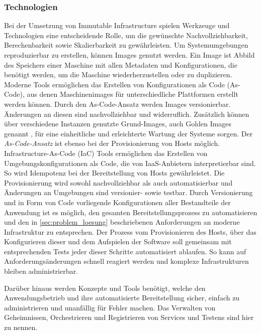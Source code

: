 \documentclass[11pt]{scrartcl}
\begin{document}
\subsubsection{Technologien} 
Bei der Umsetzung von Immutable Infrastructure spielen Werkzeuge und Technologien eine entscheidende Rolle, um die gewünschte Nachvollziehbarkeit, Berechenbarkeit sowie Skalierbarkeit zu gewährleisten. \newline 
Um Systemumgebungen reproduzierbar zu erstellen, können Images genutzt werden. Ein Image ist Abbild des Speichers einer Maschine mit allen Metadaten und Konfigurationen, die benötigt werden, um die Maschine wiederherzustellen oder zu duplizieren. Moderne Tools ermöglichen das Erstellen von Konfigurationen als Code (As-Code), aus denen Maschinenimages für unterschiedliche Plattformen erstellt werden können. Durch den \glqq As-Code\grqq{}-Ansatz werden Images versionierbar. Änderungen an diesen sind nachvollziehbar und widerruflich. Zusätzlich können über verschiedene Instanzen genutzte Grund-Images, auch Golden Images genannt \cite{GoldenImage:2018}, für eine einheitliche und erleichterte Wartung der Systeme sorgen. 
\newline
Der \textit{As-Code-Ansatz } ist ebenso bei der Provisionierung von Hosts möglich. Infrastructure-As-Code (IaC) Tools ermöglichen das Erstellen von Umgebungskonfigurationen als Code, die von IaaS-Anbietern interpretierbar sind. So wird Idempotenz bei der Bereitstellung von Hosts gewährleistet. Die Provisionierung wird sowohl nachvollziehbar als auch automatisierbar und Änderungen an Umgebungen sind versionier- sowie testbar.
Durch Versionierung und in Form von Code vorliegende Konfigurationen aller Bestandteile der Anwendung ist es möglich, den gesamten Bereitstellungsprozess zu automatisieren und den in \cref{sec:problem_loesung} beschriebenen Anforderungen an moderne Infrastruktur zu entsprechen. Der Prozess vom Provisionieren des Hosts, über das Konfigurieren dieser und dem Aufspielen der Software soll gemeinsam mit entsprechenden Tests jeder dieser Schritte automatisiert ablaufen. So kann auf Anforderungsänderungen schnell reagiert werden und komplexe Infrastrukturen bleiben administrierbar.

Darüber hinaus werden Konzepte und Tools benötigt, welche den Anwendungsbetrieb und ihre automatisierte Bereitstellung sicher, einfach zu administrieren und unanfällig für Fehler machen. Das Verwalten von Geheimnissen, Orchestrieren und Registrieren von Services und Testens sind hier zu nennen.
\end{document}
